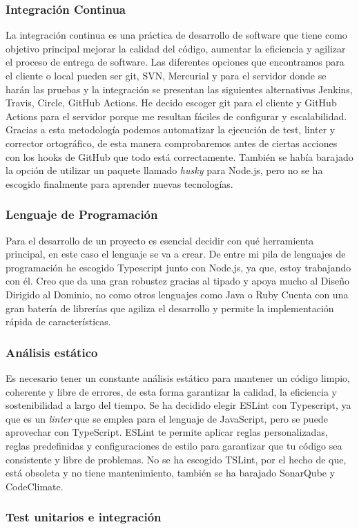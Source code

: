\subsubsection*{Integración Continua}
La integración continua es una práctica de desarrollo de software que tiene como objetivo principal mejorar la calidad del código, aumentar la eficiencia y agilizar el proceso de entrega de software.
Las diferentes opciones que encontramos para el cliente o local pueden ser git, SVN, Mercurial y para el servidor donde se harán las pruebas y la integración se presentan las siguientes
alternativas Jenkins, Travis, Circle, GitHub Actions. He decido escoger git para el cliente y GitHub Actions para el servidor porque me resultan fáciles de configurar y escalabilidad.
Gracias a esta metodología podemos automatizar la ejecución de test, linter y corrector ortográfico, de esta manera comprobaremos antes de ciertas acciones con los hooks de GitHub que todo está
correctamente. También se había barajado la opción de utilizar un paquete llamado \textit{husky} para Node.js, pero no se ha escogido finalmente para aprender nuevas tecnologías.


\subsubsection*{Lenguaje de Programación}
Para el desarrollo de un proyecto es esencial decidir con qué herramienta principal, en este caso el lenguaje se va a crear. De entre mi pila de lenguajes de programación he
escogido Typescript junto con Node.js, ya que, estoy trabajando con él. Creo que da una gran robustez gracias al tipado y apoya mucho al Diseño Dirigido al Dominio, no como otros lenguajes como Java o Ruby
Cuenta con una gran batería de librerías que agiliza el desarrollo y permite la implementación rápida de características.


\subsubsection*{Análisis estático}
Es necesario tener un constante análisis estático para mantener un código limpio, coherente y libre de errores, de esta forma garantizar la calidad, la eficiencia y sostenibilidad a largo
del tiempo. Se ha decidido elegir ESLint con Typescript, ya que es un \textit{linter} que se emplea para el lenguaje de JavaScript, pero se puede aprovechar con TypeScript.
ESLint te permite aplicar reglas personalizadas, reglas predefinidas y configuraciones de estilo para garantizar que tu código sea consistente y libre de problemas.
No se ha escogido TSLint, por el hecho de que, está obsoleta y no tiene mantenimiento, también se ha barajado SonarQube y CodeClimate.

\subsubsection*{Test unitarios e integración}
